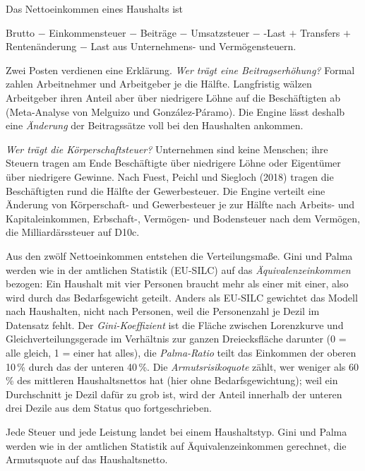Das Nettoeinkommen eines Haushalts ist
\begin{center}
Brutto $-$ Einkommensteuer $-$ Beiträge $-$ Umsatzsteuer $-$ \COz-Last $+$ Transfers $+$
Rentenänderung $-$ Last aus Unternehmens- und Vermögensteuern.
\end{center}

Zwei Posten verdienen eine Erklärung. \emph{Wer trägt eine Beitragserhöhung?} Formal zahlen
Arbeitnehmer und Arbeitgeber je die Hälfte. Langfristig wälzen Arbeitgeber ihren Anteil
aber über niedrigere Löhne auf die Beschäftigten ab (Meta-Analyse von Melguizo und
González-Páramo). Die Engine lässt deshalb eine \emph{Änderung} der Beitragssätze voll bei
den Haushalten ankommen.

\emph{Wer trägt die Körperschaftsteuer?} Unternehmen sind keine Menschen; ihre Steuern tragen
am Ende Beschäftigte über niedrigere Löhne oder Eigentümer über niedrigere Gewinne. Nach
Fuest, Peichl und Siegloch (2018) tragen die Beschäftigten rund die Hälfte der
Gewerbesteuer. Die Engine verteilt eine Änderung von Körperschaft- und Gewerbesteuer je zur
Hälfte nach Arbeits- und Kapitaleinkommen, Erbschaft-, Vermögen- und Bodensteuer nach dem
Vermögen, die Milliardärssteuer auf D10c.

Aus den zwölf Nettoeinkommen entstehen die Verteilungsmaße. Gini und Palma werden wie in der
amtlichen Statistik (EU-SILC) auf das \emph{Äquivalenzeinkommen} bezogen: Ein Haushalt mit
vier Personen braucht mehr als einer mit einer, also wird durch das Bedarfsgewicht geteilt.
Anders als EU-SILC gewichtet das Modell nach Haushalten, nicht nach Personen, weil die
Personenzahl je Dezil im Datensatz fehlt. Der \emph{Gini-Koeffizient} ist die Fläche zwischen
Lorenzkurve und Gleichverteilungsgerade im Verhältnis zur ganzen Dreiecksfläche darunter (0 =
alle gleich, 1 = einer hat alles), die \emph{Palma-Ratio} teilt das Einkommen der oberen
10\,\% durch das der unteren 40\,\%. Die \emph{Armutsrisikoquote} zählt, wer weniger als 60\,\%
des mittleren Haushaltsnettos hat (hier ohne Bedarfsgewichtung); weil ein Durchschnitt je
Dezil dafür zu grob ist, wird der Anteil innerhalb der unteren drei Dezile aus dem Status quo
fortgeschrieben.

\begin{merksatz}
Jede Steuer und jede Leistung landet bei einem Haushaltstyp. Gini und Palma werden wie in
der amtlichen Statistik auf Äquivalenzeinkommen gerechnet, die Armutsquote auf das
Haushaltsnetto.
\end{merksatz}

